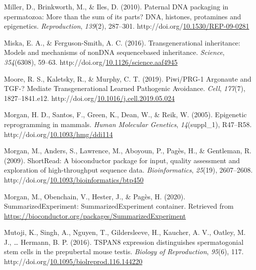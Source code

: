 \documentclass[12pt,twoside]{reedthesis}
\newlength{\cslhangindent}
\newenvironment{CSLReferences}[2] %
 {%
  \setlength{\parindent}{0pt}
  \ifodd #1 \everypar{\setlength{\hangindent}{\cslhangindent}}\ignorespaces\fi
  \ifnum #2 > 0
  \setlength{\parskip}{#2\baselineskip}
  \fi
 }%
 {}
\begin{document}
\begin{CSLReferences}{1}{0}
\leavevmode{}%
Miller, D., Brinkworth, M., \& Iles, D. (2010). Paternal DNA packaging in spermatozoa: More than the sum of its parts? DNA, histones, protamines and epigenetics. \emph{Reproduction}, \emph{139}(2), 287--301. http://doi.org/\href{https://doi.org/10.1530/REP-09-0281}{10.1530/REP-09-0281}

\leavevmode{}%
Miska, E. A., \& Ferguson-Smith, A. C. (2016). Transgenerational inheritance: Models and mechanisms of non{\textendash}DNA sequence{\textendash}based inheritance. \emph{Science}, \emph{354}(6308), 59--63. http://doi.org/\href{https://doi.org/10.1126/science.aaf4945}{10.1126/science.aaf4945}

\leavevmode{}%
Moore, R. S., Kaletsky, R., \& Murphy, C. T. (2019). Piwi/PRG-1 Argonaute and TGF-? Mediate Transgenerational Learned Pathogenic Avoidance. \emph{Cell}, \emph{177}(7), 1827--1841.e12. http://doi.org/\href{https://doi.org/10.1016/j.cell.2019.05.024}{10.1016/j.cell.2019.05.024}

\leavevmode{}%
Morgan, H. D., Santos, F., Green, K., Dean, W., \& Reik, W. (2005). Epigenetic reprogramming in mammals. \emph{Human Molecular Genetics}, \emph{14}(suppl{\_}1), R47--R58. http://doi.org/\href{https://doi.org/10.1093/hmg/ddi114}{10.1093/hmg/ddi114}

\leavevmode{}%
Morgan, M., Anders, S., Lawrence, M., Aboyoun, P., Pagès, H., \& Gentleman, R. (2009). ShortRead: A bioconductor package for input, quality assessment and exploration of high-throughput sequence data. \emph{Bioinformatics}, \emph{25}(19), 2607--2608. http://doi.org/\href{https://doi.org/10.1093/bioinformatics/btp450}{10.1093/bioinformatics/btp450}

\leavevmode{}%
Morgan, M., Obenchain, V., Hester, J., \& Pagès, H. (2020). SummarizedExperiment: SummarizedExperiment container. Retrieved from \url{https://bioconductor.org/packages/SummarizedExperiment}

\leavevmode{}%
Mutoji, K., Singh, A., Nguyen, T., Gildersleeve, H., Kaucher, A. V., Oatley, M. J., \ldots{} Hermann, B. P. (2016). TSPAN8 expression distinguishes spermatogonial stem cells in the prepubertal mouse testis. \emph{Biology of Reproduction}, \emph{95}(6), 117. http://doi.org/\href{https://doi.org/10.1095/biolreprod.116.144220}{10.1095/biolreprod.116.144220}


\end{CSLReferences}
\end{document}

